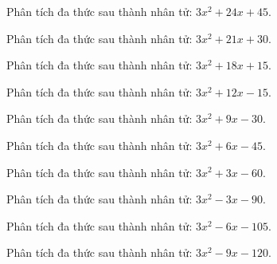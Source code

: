 \begin{bt}
	Phân tích đa thức sau thành nhân tử: $3 x^2 + 24 x + 45$.
\end{bt}
\begin{bt}
	Phân tích đa thức sau thành nhân tử: $3 x^2 + 21 x + 30$.
\end{bt}
\begin{bt}
	Phân tích đa thức sau thành nhân tử: $3 x^2 + 18 x + 15$.
\end{bt}
\begin{bt}
	Phân tích đa thức sau thành nhân tử: $3 x^2 + 12 x - 15$.
\end{bt}
\begin{bt}
	Phân tích đa thức sau thành nhân tử: $3 x^2 + 9 x - 30$.
\end{bt}
\begin{bt}
	Phân tích đa thức sau thành nhân tử: $3 x^2 + 6 x - 45$.
\end{bt}
\begin{bt}
	Phân tích đa thức sau thành nhân tử: $3 x^2 + 3 x - 60$.
\end{bt}
\begin{bt}
	Phân tích đa thức sau thành nhân tử: $3 x^2 - 3 x - 90$.
\end{bt}
\begin{bt}
	Phân tích đa thức sau thành nhân tử: $3 x^2 - 6 x - 105$.
\end{bt}
\begin{bt}
	Phân tích đa thức sau thành nhân tử: $3 x^2 - 9 x - 120$.
\end{bt}
